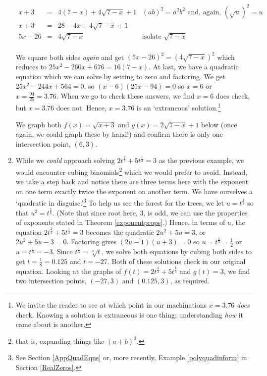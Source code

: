 \documentclass{ximera}
\begin{document}
\begin{example}
\begin{enumerate}
\[\begin{array}{rclr}
 
 x+3 & = & 4(7-x) + 4\sqrt{7-x} + 1 &  \text{$(ab)^2 = a^2b^2$ and, again, $(\sqrt{u})^2 = u$} \\
 
 x+3 & = & 28-4x+4\sqrt{7-x} + 1 & \\
 
 5x-26 & = & 4\sqrt{7-x} & \text{isolate $\sqrt{7-x}$} \\ \end{array} \]
 
We square both sides \textit{again} and get $(5x-26)^2 = (4\sqrt{7-x})^2$ which reduces to $25x^2-260x+676 = 16(7-x)$. At last, we have a quadratic equation which we can solve by setting to zero and factoring.  We get  $25x^2-244x+564 = 0$, so $(x-6)(25x-94) = 0$ so $x = 6$ or $x = \frac{94}{25} = 3.76$.  When we go to check these answers, we find $x=6$ does check, but $x = 3.76$ does not. Hence, $x=3.76$ is an `extraneous' solution.\footnote{We invite the reader to see at which point in our machinations $x=3.76$ \textit{does} check.  Knowing a solution is extraneous is one thing;  understanding \textit{how} it came about is another.}

We graph both $f(x) = \sqrt{x+3}$ and $g(x) = 2\sqrt{7-x} + 1$ below (once again, we could graph these by hand!) and confirm there is only one intersection point, $(6,3)$.

\item  While we \textit{could} approach solving  $2t^{\frac{2}{3}} + 5t^{\frac{1}{3}} = 3$ as the previous example, we would encounter cubing binomials\footnote{that is, expanding things like $(a+b)^3$.} which we would prefer to avoid.  Instead, we take a step back and notice there are three terms here with the exponent on one term exactly twice the exponent on another term.  We have ourselves a `quadratic in disguise.'\footnote{See Section \ref{AppQuadEqus} or, more recently, Example \ref{polyquadinform} in Section \ref{RealZeros}.} To help us see the forest for the trees, we let $u = t^{\frac{1}{3}}$ so that $u^2 = t^{\frac{2}{3}}$. (Note that since root here, $3$, is odd, we can use the properties of exponents stated in Theorem \ref{exponentprops}.)  Hence, in terms of $u$, the equation   $2t^{\frac{2}{3}} + 5t^{\frac{1}{3}} = 3$ becomes the quadratic $2u^2 + 5u = 3$, or $2u^2 + 5u - 3 = 0$.  Factoring gives $(2u-1)(u+3) = 0$ so $u = t^{\frac{1}{3}} = \frac{1}{2}$ or $u = t^{\frac{1}{3}} = -3$.  Since $t^{\frac{1}{3}} = \sqrt[3]{t}$, we solve both equations by cubing both sides to get $t = \frac{1}{8} = 0.125$ and $t = -27$.  Both of these solutions check in our original equation.  Looking at the graphs of $f(t) = 2t^{\frac{2}{3}} + 5t^{\frac{1}{3}}$ and $g(t) = 3$, we find two intersection points, $(-27,3)$ and $(0.125,3)$, as required.


\end{enumerate}
\end{example}
\end{document}

